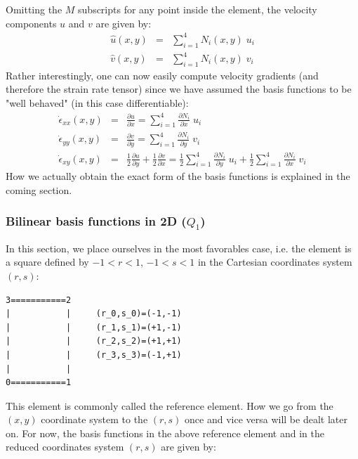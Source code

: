 Omitting the $M$ subscripts for any point inside the element, the velocity components $u$
and $v$ are given by:
\begin{eqnarray}
\hat{u}(x,y) &=& \sum_{i=1}^4 N_i(x,y)\;  u_i \\
\hat{v}(x,y) &=& \sum_{i=1}^4 N_i(x,y)\;  v_i \label{bf01}
\end{eqnarray}
Rather interestingly, one can now easily compute velocity gradients (and therefore the 
strain rate tensor) since we have assumed the basis functions to be "well behaved" 
(in this case differentiable):
\begin{eqnarray}
\dot{\epsilon}_{xx}(x,y) &=& \frac{\partial u}{\partial x} = \sum_{i=1}^4 \frac{\partial N_i}{\partial x}\;  u_i \\
\dot{\epsilon}_{yy}(x,y) &=& \frac{\partial v}{\partial y} = \sum_{i=1}^4 \frac{\partial N_i}{\partial y}\;  v_i \\
\dot{\epsilon}_{xy}(x,y) &=& \frac{1}{2}\frac{\partial u}{\partial y} 
+ \frac{1}{2}\frac{\partial v}{\partial x} 
= \frac{1}{2}\sum_{i=1}^4 \frac{\partial N_i}{\partial y}\;  u_i
+ \frac{1}{2}\sum_{i=1}^4 \frac{\partial N_i}{\partial x}\;  v_i
\end{eqnarray}
How we actually obtain the exact form of the basis functions is explained in the coming section.













\subsubsection{Bilinear basis functions in 2D ($Q_1$)}

In this section, we place ourselves in the most favorables case, i.e. the element is a square defined 
by $-1<r<1$, $-1<s<1$ in the Cartesian coordinates system $(r,s)$:

\begin{verbatim}
3===========2       
|           |     (r_0,s_0)=(-1,-1)
|           |     (r_1,s_1)=(+1,-1)
|           |     (r_2,s_2)=(+1,+1)
|           |     (r_3,s_3)=(-1,+1)
|           |
0===========1
\end{verbatim}


This element is commonly called the reference element. How we go from the $(x,y)$ coordinate system 
to the $(r,s)$ once and vice versa will be dealt later on.
For now, the basis functions in the above reference element and in the reduced 
coordinates system $(r,s)$ are given by:

